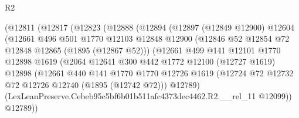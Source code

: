 \begin{lexlean}{R2}
\begin{coremodule}
                            (@12811
                              (@12817
                                (@12823
                                  (@12888
                                    (@12894
                                      (@12897
                                        (@12849 @12900)
                                        @12604
                                        (@12661
                                          @496
                                          @501
                                          @1770
                                          @12103
                                          @12848
                                          @12900
                                          (@12846 @52 @12854 @72 @12848 @12865 (@1895 (@12867 @52)))
                                          (@12661
                                            @499
                                            @141
                                            @12101
                                            @1770
                                            @12898
                                            @1619
                                            (@2064
                                              @12641
                                              @300
                                              @442
                                              @1772
                                              @12100
                                              (@12727 @1619)
                                              @12898
                                              (@12661
                                                @440
                                                @141
                                                @1770
                                                @1770
                                                @12726
                                                @1619
                                                (@12724
                                                  @72
                                                  @12732
                                                  @72
                                                  @12726
                                                  @12740
                                                  (@1895 (@12742 @72)))
                                                @12789)
                                              (LexLeanPreserve.Cebeb95c5bf6b01b511afc4373dec4462.R2.__rel_11
                                                @12099))
                                            @12789))

\end{coremodule}
\end{lexlean}
